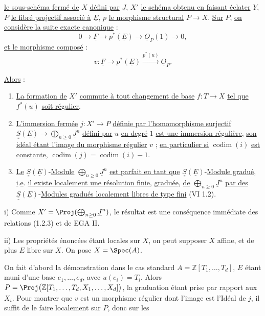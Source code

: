 
\uline{le sous-schéma fermé de} \(X\) \uline{défini par} \(\underline{J}\), \(X'\) \uline{le schéma obtenu en faisant éclater} \(Y\), \(P\) \uline{le fibré projectif associé à} \(\underline{E}\), \(p\) \uline{le morphisme structural} \(P\to X\). \uline{Sur} \(P\), \uline{on considère la suite exacte canonique} :
\[
0\to \underline{F}\to p^*(\underline{E})\to\underline{O}_P(1)\to0,
\]
\uline{et le morphisme composé} :
\[
 v:\underline{F}\longrightarrow p^*(\underline{E})\xrightarrow{p^*(u)}\underline{O}_P .
\]

\uline{Alors} :
\begin{enumerate}[label=\roman*)]
\item \uline{La formation de} \(X'\) \uline{commute à tout changement de base} \(f:T\to X\) \uline{tel que} \(f^*(u)\) \uline{soit régulier}.
\item \uline{L'immersion fermée} \(j:X'\to P\) \uline{définie par l'homomorphisme surjectif} \(\underline{\underline{S}}(\underline{E})\longrightarrow\bigoplus_{n\ge0}\underline{J}^n\) \uline{défini par} \(u\) \uline{en degré} \(1\) \uline{est une immersion régulière}, \uline{son idéal étant l'image du morphisme régulier} \(v\) ; \uline{en particulier si} \(\operatorname{codim}(i)\) \uline{est constante}, \(\operatorname{codim}(j)=\operatorname{codim}(i)-1\).
\item \uline{Le} \(\underline{\underline{S}}(\underline{E})\)-\uline{Module} \(\bigoplus_{n\ge0}\underline{J}^n\) \uline{est parfait en tant que} \(\underline{\underline{S}}(\underline{E})\)-\uline{Module gradué}, \uline{i}.\uline{e}. \uline{il existe localement une résolution finie}, \uline{graduée}, \uline{de} \(\bigoplus_{n\ge0}\underline{J}^n\) \uline{par des} \(\underline{\underline{S}}(\underline{E})\)-\uline{Modules gradués localement libres de type fini} (VI 1.2).
\end{enumerate}

i) Comme \(X'=\Proj(\bigoplus_{n\ge0}\underline{J}^n)\), le résultat est une conséquence immédiate des relations (1.2.3) et de EGA II.

ii) Les propriétés énoncées étant locales sur \(X\), on peut supposer \(X\) affine, et de plus \(\underline{E}\) libre sur \(X\). On pose \(X=\Spec(A)\).

On fait d'abord la démonstration dans le cas standard \(A=\mathbb Z[T_1,\ldots,T_d]\), \(E\) étant muni d'une base \(e_1,\ldots,e_d\), avec \(u(e_i)=T_i\). Alors \(P=\Proj\bigl(\mathbb Z[T_1,\ldots,T_d,X_1,\ldots,X_d]\bigr)\), la graduation étant prise par rapport aux \(X_i\). Pour montrer que \(v\) est un morphisme régulier dont l'image est l'Idéal de \(j\), il suffit de le faire localement sur \(P\), donc sur les
